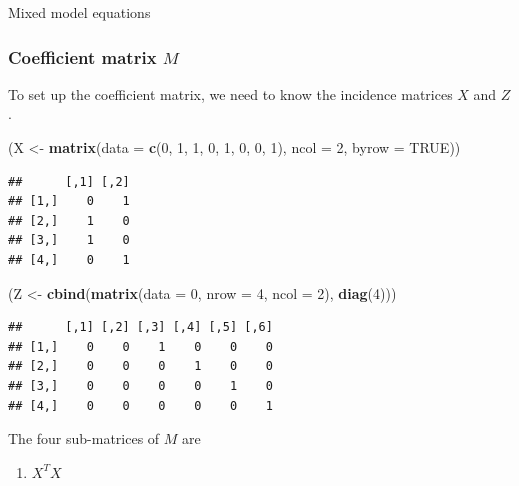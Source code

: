 \documentclass[]{article}
\newenvironment{Shaded}{\begin{snugshade}}{\end{snugshade}}
\newcommand{\KeywordTok}[1]{\textcolor[rgb]{0.13,0.29,0.53}{\textbf{#1}}}
\newcommand{\DataTypeTok}[1]{\textcolor[rgb]{0.13,0.29,0.53}{#1}}
\newcommand{\DecValTok}[1]{\textcolor[rgb]{0.00,0.00,0.81}{#1}}
\newcommand{\StringTok}[1]{\textcolor[rgb]{0.31,0.60,0.02}{#1}}
\newcommand{\OtherTok}[1]{\textcolor[rgb]{0.56,0.35,0.01}{#1}}
\newcommand{\NormalTok}[1]{#1}
\providecommand{\tightlist}{%
  \setlength{\itemsep}{0pt}\setlength{\parskip}{0pt}}
\begin{document}
Mixed model equations

\subsubsection{\texorpdfstring{Coefficient matrix
\(M\)}{Coefficient matrix M}}\label{coefficient-matrix-m}

To set up the coefficient matrix, we need to know the incidence matrices
\(X\) and \(Z\).

\begin{Shaded}
\begin{Highlighting}[]
\NormalTok{(X <-}\StringTok{ }\KeywordTok{matrix}\NormalTok{(}\DataTypeTok{data =} \KeywordTok{c}\NormalTok{(}\DecValTok{0}\NormalTok{, }\DecValTok{1}\NormalTok{,}
                     \DecValTok{1}\NormalTok{, }\DecValTok{0}\NormalTok{,}
                     \DecValTok{1}\NormalTok{, }\DecValTok{0}\NormalTok{,}
                     \DecValTok{0}\NormalTok{, }\DecValTok{1}\NormalTok{), }\DataTypeTok{ncol =} \DecValTok{2}\NormalTok{, }\DataTypeTok{byrow =} \OtherTok{TRUE}\NormalTok{))}
\end{Highlighting}
\end{Shaded}

\begin{verbatim}
##      [,1] [,2]
## [1,]    0    1
## [2,]    1    0
## [3,]    1    0
## [4,]    0    1
\end{verbatim}

\begin{Shaded}
\begin{Highlighting}[]
\NormalTok{(Z <-}\StringTok{ }\KeywordTok{cbind}\NormalTok{(}\KeywordTok{matrix}\NormalTok{(}\DataTypeTok{data =} \DecValTok{0}\NormalTok{, }\DataTypeTok{nrow =} \DecValTok{4}\NormalTok{, }\DataTypeTok{ncol =} \DecValTok{2}\NormalTok{), }\KeywordTok{diag}\NormalTok{(}\DecValTok{4}\NormalTok{)))}
\end{Highlighting}
\end{Shaded}

\begin{verbatim}
##      [,1] [,2] [,3] [,4] [,5] [,6]
## [1,]    0    0    1    0    0    0
## [2,]    0    0    0    1    0    0
## [3,]    0    0    0    0    1    0
## [4,]    0    0    0    0    0    1
\end{verbatim}

The four sub-matrices of \(M\) are

\begin{enumerate}
\def\labelenumi{\arabic{enumi}.}
\tightlist
\item
  \(X^TX\)
\end{enumerate}
\end{document}
